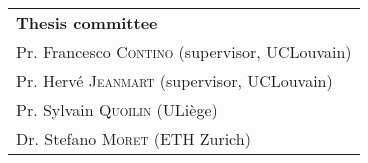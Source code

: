 \begin{titlingpage}
\vspace{\fill}
\begin{small}
\begin{tabular}{l}
\textbf{Thesis committee}\\
\selectfont
Pr. Francesco \textsc{Contino} (supervisor, UCLouvain) \\ 
Pr. Hervé \textsc{Jeanmart} (supervisor, UCLouvain) \\ 
Pr. Sylvain \textsc{Quoilin} (ULiège) \\
Dr. Stefano \textsc{Moret} (ETH Zurich)\\
\end{tabular} 
\end{small}
%
\clearpage

\end{titlingpage}



